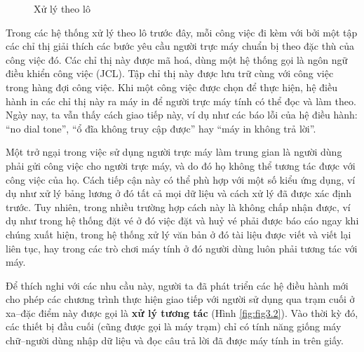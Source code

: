 \begin{figure}[bt]
\centering
\caption{Xử lý theo lô}
  \label{fig:fig3.1}
\end{figure}

Trong các hệ thống xử lý theo lô trước đây, mỗi công việc đi kèm với bởi một tập các chỉ
thị giải thích các bước yêu cầu người trực máy chuẩn bị theo đặc thù của công việc đó. Các
chỉ thị này được mã hoá, dùng một hệ thống gọi là ngôn ngữ điều khiển công việc (JCL). Tập
chỉ thị này được lưu trữ cùng với công việc trong hàng đợi công việc. Khi một công việc
được chọn để thực hiện, hệ điều hành in các chỉ thị này ra máy in để người trực máy tính
có thể đọc và làm theo. Ngày nay, ta vẫn thấy cách giao tiếp này, ví dụ như các báo lỗi
của hệ điều hành: ``no dial tone'', ``ổ đĩa không truy cập được'' hay ``máy in không trả
lời''.

Một trở ngại trong việc sử dụng người trực máy làm trung gian là người dùng phải gửi công
việc cho người trực máy, và do đó họ không thể tương tác được với công việc của họ. Cách
tiếp cận này có thể phù hợp với một số kiểu ứng dụng, ví dụ như xử lý bảng lương ở đó tất
cả mọi dữ liệu và cách xử lý đã được xác định trước. Tuy nhiên, trong nhiều trường hợp
cách này là không chấp nhận được, ví dụ như trong hệ thống đặt vé ở đó việc đặt và huỷ vé
phải được báo cáo ngay khi chúng xuất hiện, trong hệ thống xử lý văn bản ở đó tài liệu
được viết và viết lại liên tục, hay trong các trò chơi máy tính ở đó người dùng luôn phải
tương tác với máy.

Để thích nghi với các nhu cầu này, người ta đã phát triển các hệ điều hành mới cho phép
các chương trình thực hiện giao tiếp với người sử dụng qua trạm cuối ở xa--đặc điểm này
được gọi là \textbf{xử lý tương tác} (Hình \ref{fig:fig3.2}). Vào thời kỳ đó, các thiết bị
đầu cuối (cũng được gọi là máy trạm) chỉ có tính năng giống máy chữ--người dùng nhập dữ
liệu và đọc câu trả lời đã được máy tính in trên giấy.

